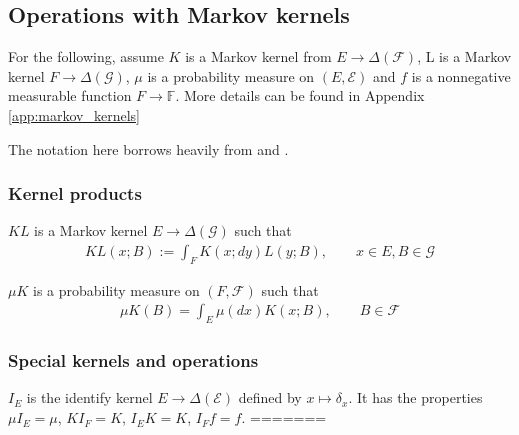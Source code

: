 
\subsection{Operations with Markov kernels}

For the following, assume $K$ is a Markov kernel from $E\to \Delta(\mathcal{F})$, L is a Markov kernel $F\to \Delta(\mathcal{G})$, $\mu$ is a probability measure on $(E,\mathcal{E})$ and $f$ is a nonnegative measurable function $F\to \mathbb{F}$. More details can be found in Appendix \ref{app:markov_kernels}


The notation here borrows heavily from \cite{cinlar_probability_2011} and \cite{fong_causal_2013}.


\subsubsection{Kernel products}


$KL$ is a Markov kernel $E\to \Delta(\mathcal{G})$ such that
\begin{align}
    KL(x;B):= \int_F K(x;dy) L(y;B),\qquad x\in E, B\in \mathcal{G}
\end{align}

$\mu K$ is a probability measure on $(F,\mathcal{F})$ such that
\begin{align}
    \mu K(B)=\int_E \mu(dx) K(x;B),\qquad B\in\mathcal{F}
\end{align}

\subsubsection{Special kernels and operations}


$I_E$ is the identify kernel $E\to \Delta(\mathcal{E})$ defined by $x\mapsto \delta_x$. It has the properties $\mu I_E=\mu$, $KI_F = K$, $I_E K = K$, $I_F f=f$.
=======




